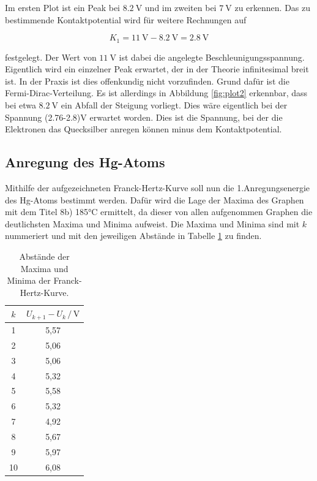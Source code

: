 Im ersten Plot ist ein Peak bei $\SI{8.2}{\volt}$ und im zweiten bei $\SI{7}{\volt}$ zu erkennen. 
Das zu bestimmende Kontaktpotential wird für weitere Rechnungen auf 

\begin{equation*}
K_1 = \SI{11}{\volt}-\SI{8.2}{\volt} = \SI{2.8}{\volt}
\end{equation*}

festgelegt. Der Wert von $\SI{11}{\volt}$ ist dabei die angelegte Beschleunigungsspannung.
Eigentlich wird ein einzelner Peak erwartet, der in der Theorie infinitesimal breit ist. In der Praxis 
ist dies offenkundig nicht vorzufinden. Grund dafür ist die Fermi-Dirac-Verteilung. 
Es ist allerdings in Abbildung \ref{fig:plot2} erkennbar, dass bei etwa $\SI{8.2}{\volt}$ ein Abfall der 
Steigung vorliegt. Dies wäre eigentlich bei der Spannung (2.76-2.8)V erwartet worden. Dies ist die Spannung, 
bei der die Elektronen das Quecksilber anregen können minus dem Kontaktpotential. 

\subsection{Anregung des Hg-Atoms}

Mithilfe der aufgezeichneten Franck-Hertz-Kurve soll nun die 1.Anregungsenergie des Hg-Atoms bestimmt 
werden. Dafür wird die Lage der Maxima des Graphen mit dem Titel 8b) 185°C ermittelt, da dieser von
allen aufgenommen Graphen die deutlichsten Maxima und Minima aufweist. Die Maxima und Minima sind mit $k$
nummeriert und mit den jeweiligen Abstände in Tabelle \ref{tab:Max} zu finden. 

\begin{table}
  \centering
  \caption{Abstände der Maxima und Minima der Franck-Hertz-Kurve.}
  \label{tab:Max}
  \begin{tabular}{c c}
  \toprule
  $k$ & $U_{k+1}-U_{k} \,/\, \si{\volt}$\\
  \midrule 
   1 & 5,57\\
   2 & 5,06\\
   3 & 5,06\\
   4 & 5,32\\
   5 & 5,58\\
   6 & 5,32\\
   7 & 4,92\\
   8 & 5,67\\
   9 & 5,97\\
  10 & 6,08\\
  \bottomrule
  \end{tabular}
  \end{table}

